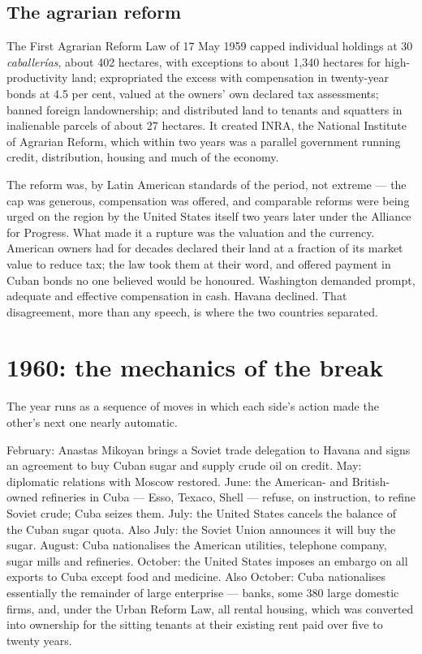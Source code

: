 \subsection{The agrarian reform}

The First Agrarian Reform Law of 17 May 1959 capped individual holdings at 30
\emph{caballer\'ias}, about 402 hectares, with exceptions to about 1,340
hectares for high-productivity land; expropriated the excess with compensation
in twenty-year bonds at 4.5 per cent, valued at the owners' own declared tax
assessments; banned foreign landownership; and distributed land to tenants and
squatters in inalienable parcels of about 27 hectares. It created INRA, the
National Institute of Agrarian Reform, which within two years was a parallel
government running credit, distribution, housing and much of the economy.

The reform was, by Latin American standards of the period, not extreme --- the
cap was generous, compensation was offered, and comparable reforms were being
urged on the region by the United States itself two years later under the
Alliance for Progress. What made it a rupture was the valuation and the
currency. American owners had for decades declared their land at a fraction of
its market value to reduce tax; the law took them at their word, and offered
payment in Cuban bonds no one believed would be honoured. Washington demanded
prompt, adequate and effective compensation in cash. Havana declined. That
disagreement, more than any speech, is where the two countries separated.

\section{1960: the mechanics of the break}

The year runs as a sequence of moves in which each side's action made the
other's next one nearly automatic.

February: Anastas Mikoyan brings a Soviet trade delegation to Havana and signs
an agreement to buy Cuban sugar and supply crude oil on credit. May:
diplomatic relations with Moscow restored. June: the American- and
British-owned refineries in Cuba --- Esso, Texaco, Shell --- refuse, on
instruction, to refine Soviet crude; Cuba seizes them. July: the United States
cancels the balance of the Cuban sugar quota. Also July: the Soviet Union
announces it will buy the sugar. August: Cuba nationalises the American
utilities, telephone company, sugar mills and refineries. October: the United
States imposes an embargo on all exports to Cuba except food and medicine. Also
October: Cuba nationalises essentially the remainder of large enterprise ---
banks, some 380 large domestic firms, and, under the Urban Reform Law, all
rental housing, which was converted into ownership for the sitting tenants at
their existing rent paid over five to twenty years.

